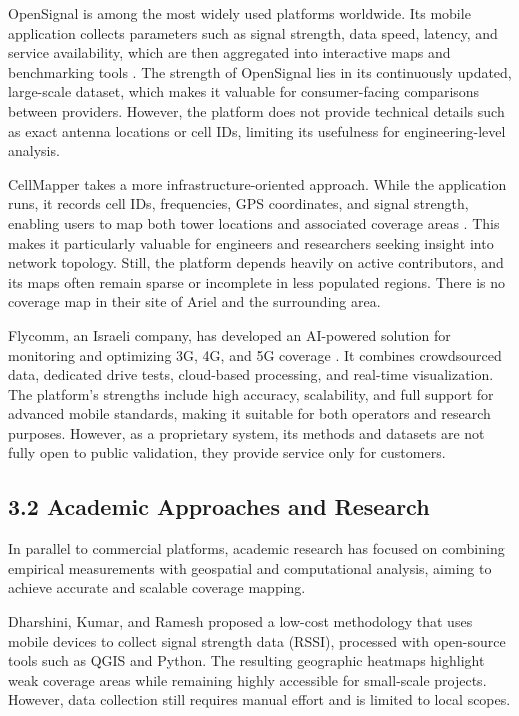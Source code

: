 \documentclass[11pt]{article}
\begin{document}
OpenSignal is among the most widely used platforms worldwide. Its mobile
application collects parameters such as signal strength, data speed,
latency, and service availability, which are then aggregated into
interactive maps and benchmarking tools \cite{opensignal2024}. The strength
of OpenSignal lies in its continuously updated, large-scale dataset,
which makes it valuable for consumer-facing comparisons between
providers. However, the platform does not provide technical details such
as exact antenna locations or cell IDs, limiting its usefulness for
engineering-level analysis.

CellMapper takes a more infrastructure-oriented approach. While the
application runs, it records cell IDs, frequencies, GPS coordinates, and
signal strength, enabling users to map both tower locations and
associated coverage areas \cite{cellmapper2024}. This makes it particularly
valuable for engineers and researchers seeking insight into network
topology. Still, the platform depends heavily on active contributors,
and its maps often remain sparse or incomplete in less populated
regions. There is no coverage map in their site of Ariel and the
surrounding area.

Flycomm, an Israeli company, has developed an AI-powered solution for
monitoring and optimizing 3G, 4G, and 5G coverage \cite{flycomm2024}. It
combines crowdsourced data, dedicated drive tests, cloud-based
processing, and real-time visualization. The platform's strengths
include high accuracy, scalability, and full support for advanced mobile
standards, making it suitable for both operators and research purposes.
However, as a proprietary system, its methods and datasets are not fully
open to public validation, they provide service only for customers.

\hypertarget{academic-approaches-and-research}{%
\subsection{3.2 Academic Approaches and
Research}\label{academic-approaches-and-research}}

In parallel to commercial platforms, academic research has focused on
combining empirical measurements with geospatial and computational
analysis, aiming to achieve accurate and scalable coverage mapping.

Dharshini, Kumar, and Ramesh \cite{dharshini2022} proposed a low-cost
methodology that uses mobile devices to collect signal strength data
(RSSI), processed with open-source tools such as QGIS and Python. The
resulting geographic heatmaps highlight weak coverage areas while
remaining highly accessible for small-scale projects. However, data
collection still requires manual effort and is limited to local scopes.
\end{document}
